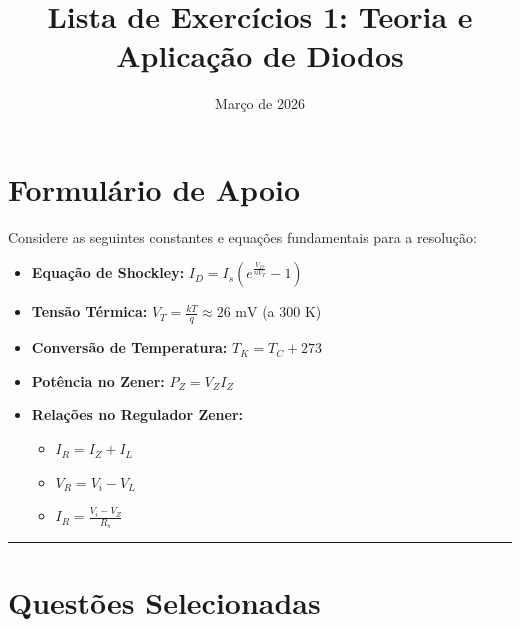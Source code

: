 \documentclass[a4paper,12pt]{article}
\title{Lista de Exercícios 1: Teoria e Aplicação de Diodos}
\date{Março de 2026}
\begin{document}
\maketitle

\section*{Formulário de Apoio}

Considere as seguintes constantes e equações fundamentais para a resolução:

\begin{itemize}
    \item \textbf{Equação de Shockley:} $I_D = I_s \left( e^{\frac{V_D}{n V_T}} - 1 \right)$
    \item \textbf{Tensão Térmica:} $V_T = \frac{k T}{q} \approx 26\text{ mV}$ (a $300\text{ K}$)
    \item \textbf{Conversão de Temperatura:} $T_K = T_C + 273$
    \item \textbf{Potência no Zener:} $P_Z = V_Z I_Z$
    \item \textbf{Relações no Regulador Zener:}
    \begin{itemize}
        \item $I_R = I_Z + I_L$
        \item $V_R = V_i - V_L$
        \item $I_R = \frac{V_i - V_Z}{R_s}$
    \end{itemize}
\end{itemize}

\hrule
\section*{Questões Selecionadas}
\end{document}
